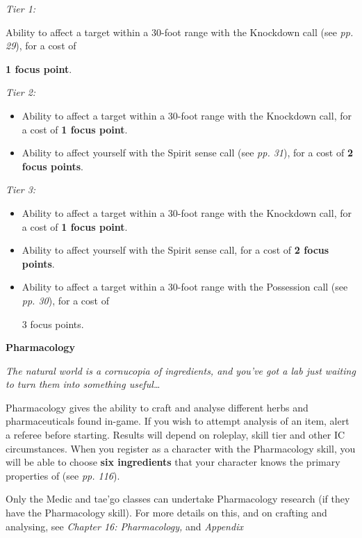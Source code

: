 \textit{Tier 1:}

Ability to affect a target within a 30-foot range with the Knockdown call (see \textit{pp. 29}), for a cost of

\textbf{1 focus point}.

\textit{Tier 2:}

\begin{itemize}
\item Ability to affect a target within a 30-foot range with the Knockdown call, for a cost of \textbf{1 focus point}.

\item Ability to affect yourself with the Spirit sense call (see \textit{pp. 31}), for a cost of \textbf{2 focus points}.

\end{itemize}
\textit{Tier 3:}

\begin{itemize}
\item Ability to affect a target within a 30-foot range with the Knockdown call, for a cost of \textbf{1 focus point}.

\item Ability to affect yourself with the Spirit sense call, for a cost of \textbf{2 focus points}.

\item Ability to affect a target within a 30-foot range with the Possession call (see \textit{pp. 30}), for a cost of

3 focus points.

\end{itemize}
\textbf{Pharmacology}

\textit{The natural world is a cornucopia of ingredients, and you've got a lab just waiting to turn them into something useful{\dots}}

Pharmacology gives the ability to craft and analyse different herbs and pharmaceuticals found in-game. If you wish to attempt analysis of an item, alert a referee before starting. Results will depend on roleplay, skill tier and other IC circumstances. When you register as a character with the Pharmacology skill, you will be able to choose \textbf{six ingredients} that your character knows the primary properties of (see \textit{pp. 116}).

Only the Medic and tae'go classes can undertake Pharmacology research (if they have the Pharmacology skill). For more details on this, and on crafting and analysing, see \textit{Chapter 16: Pharmacology}\textit{,} and \textit{Appendix}

